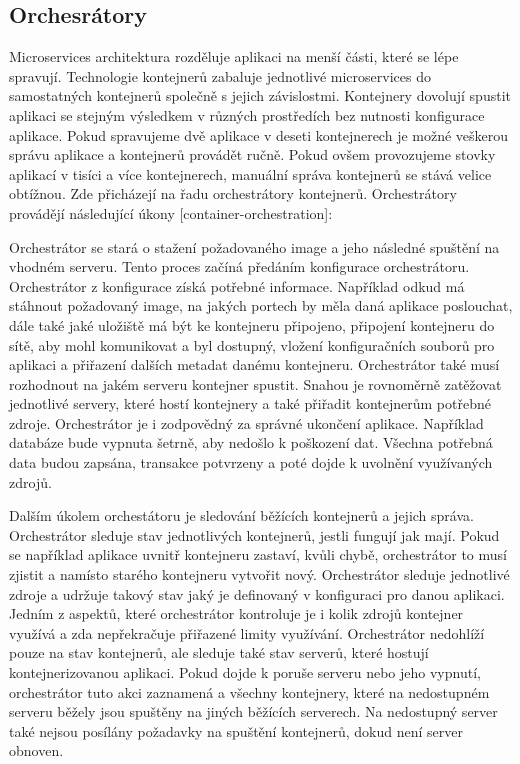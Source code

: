 \subsection{Orchesrátory}
Microservices architektura rozděluje aplikaci na menší části, které se lépe spravují. Technologie kontejnerů zabaluje jednotlivé microservices do samostatných kontejnerů společně s jejich závislostmi. Kontejnery dovolují spustit aplikaci se stejným výsledkem v různých prostředích bez nutnosti konfigurace aplikace. Pokud spravujeme dvě aplikace v deseti kontejnerech je možné veškerou správu aplikace a kontejnerů provádět ručně. Pokud ovšem provozujeme stovky aplikací v tisíci a více kontejnerech, manuální správa kontejnerů se stává velice obtížnou. Zde přicházejí na řadu orchestrátory kontejnerů. Orchestrátory provádějí následující úkony [container-orchestration]:
\begin{itemsize}
\item Orchestrátor se stará o stažení požadovaného image a jeho následné spuštění na vhodném serveru. Tento proces začíná předáním konfigurace orchestrátoru. Orchestrátor z konfigurace získá potřebné informace. Například odkud má stáhnout požadovaný image, na jakých portech by měla daná aplikace poslouchat, dále také jaké uložiště má být ke kontejneru připojeno, připojení kontejneru do sítě, aby mohl komunikovat a byl dostupný, vložení konfiguračních souborů pro aplikaci a přiřazení dalších metadat danému kontejneru. Orchestrátor také musí rozhodnout na jakém serveru kontejner spustit. Snahou je rovnoměrně zatěžovat jednotlivé servery, které hostí kontejnery a také přiřadit kontejnerům potřebné zdroje. Orchestrátor je i zodpovědný za správné ukončení aplikace. Například databáze bude vypnuta šetrně, aby nedošlo k poškození dat. Všechna potřebná data budou zapsána, transakce potvrzeny a poté dojde k uvolnění využívaných zdrojů.
\item Dalším úkolem orchestátoru je sledování běžících kontejnerů a jejich správa. Orchestrátor sleduje stav jednotlivých kontejnerů, jestli fungují jak mají. Pokud se například aplikace uvnitř kontejneru zastaví, kvůli chybě, orchestrátor to musí zjistit a namísto starého kontejneru vytvořit nový. Orchestrátor sleduje jednotlivé zdroje a udržuje takový stav jaký je definovaný v konfiguraci pro danou aplikaci. Jedním z aspektů, které orchestrátor kontroluje je i kolik zdrojů kontejner využívá a zda nepřekračuje přiřazené limity využívání. 
Orchestrátor nedohlíží pouze na stav kontejnerů, ale sleduje také stav serverů, které hostují kontejnerizovanou aplikaci. Pokud dojde k poruše serveru nebo jeho vypnutí, orchestrátor tuto akci zaznamená a všechny kontejnery, které na nedostupném serveru běžely jsou spuštěny na jiných běžících serverech. Na nedostupný server také nejsou posílány požadavky na spuštění kontejnerů, dokud není server obnoven.

\end{itemsize}
